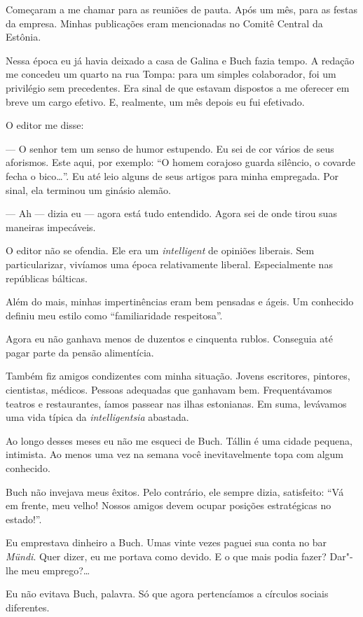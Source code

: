 Começaram a me chamar para as reuniões de pauta. Após um mês, para as
festas da empresa. Minhas publicações eram mencionadas no Comitê Central
da Estônia.

Nessa época eu já havia deixado a casa de Galina e Buch fazia tempo. A
redação me concedeu um quarto na rua Tompa: para um simples colaborador,
foi um privilégio sem precedentes. Era sinal de que estavam dispostos a me
oferecer em breve um cargo efetivo. E, realmente, um mês depois eu fui
efetivado.

O editor me disse:

--- O senhor tem um senso de humor estupendo. Eu sei de cor vários de
seus aforismos. Este aqui, por exemplo: ``O homem corajoso guarda
silêncio, o covarde fecha o bico\ldots{}''. Eu até leio alguns de
seus artigos para minha empregada. Por sinal, ela terminou um ginásio
alemão.

--- Ah --- dizia eu --- agora está tudo entendido. Agora sei de onde
tirou suas maneiras impecáveis.

O editor não se ofendia. Ele era um \emph{intelligent} de opiniões
liberais. Sem particularizar, vivíamos uma época relativamente liberal.
Especialmente nas repúblicas bálticas.

Além do mais, minhas impertinências eram bem pensadas e ágeis. Um
conhecido definiu meu estilo como ``familiaridade respeitosa''.

Agora eu não ganhava menos de duzentos e cinquenta rublos. Conseguia até
pagar parte da pensão alimentícia.

Também fiz amigos condizentes com minha situação. Jovens escritores,
pintores, cientistas, médicos. Pessoas adequadas que ganhavam bem.
Frequentávamos teatros e restaurantes, íamos passear nas ilhas
estonianas. Em suma, levávamos uma vida típica da \emph{intelligentsia}
abastada.

Ao longo desses meses eu não me esqueci de Buch. Tállin é uma cidade
pequena, intimista. Ao menos uma vez na semana você inevitavelmente topa com algum
conhecido.

Buch não invejava meus êxitos. Pelo contrário, ele sempre dizia,
satisfeito: ``Vá em frente, meu velho! Nossos amigos devem ocupar
posições estratégicas no estado!''. %

Eu emprestava dinheiro a Buch. Umas vinte vezes paguei sua conta no bar
\emph{Mündi}. Quer dizer, eu me portava como devido. E o que mais podia
fazer? Dar"-lhe meu emprego?\ldots{}

Eu não evitava Buch, palavra. Só que agora pertencíamos a círculos
sociais diferentes.

